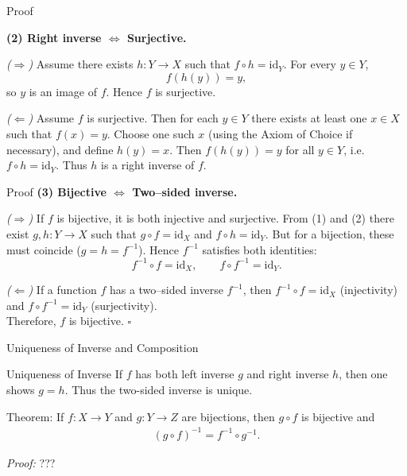 \begin{frame}{Proof }

\textbf{(2) Right inverse $\Leftrightarrow$ Surjective.}

\emph{($\Rightarrow$)}  
Assume there exists \(h:Y\to X\) such that \(f\circ h=\mathrm{id}_Y.\)  
For every \(y\in Y\),
\[
f(h(y)) = y,
\]
so \(y\) is an image of \(f\). Hence \(f\) is surjective.

\emph{($\Leftarrow$)}  
Assume \(f\) is surjective.  
Then for each \(y\in Y\) there exists at least one \(x\in X\) such that \(f(x)=y\).  
Choose one such \(x\) (using the Axiom of Choice if necessary), and define \(h(y)=x.\)  
Then \(f(h(y))=y\) for all \(y\in Y\), i.e. \(f\circ h=\mathrm{id}_Y.\)
Thus \(h\) is a right inverse of \(f.\)
\end{frame}

\begin{frame}{Proof }
\textbf{(3) Bijective $\Leftrightarrow$ Two–sided inverse.}

\emph{($\Rightarrow$)}  
If \(f\) is bijective, it is both injective and surjective.  
From (1) and (2) there exist \(g,h:Y\to X\) such that \(g\circ f=\mathrm{id}_X\) and \(f\circ h=\mathrm{id}_Y.\)  
But for a bijection, these must coincide (\(g=h=f^{-1}\)).  
Hence \(f^{-1}\) satisfies both identities:
\[
f^{-1}\circ f = \mathrm{id}_X,\qquad f\circ f^{-1} = \mathrm{id}_Y.
\]

\emph{($\Leftarrow$)}  
If a function \(f\) has a two–sided inverse \(f^{-1}\), then \(f^{-1}\circ f=\mathrm{id}_X\) (injectivity) and \(f\circ f^{-1}=\mathrm{id}_Y\) (surjectivity).\\ 

Therefore, \(f\) is bijective. \(\square\)
\end{frame}


\begin{frame}{Uniqueness of Inverse and Composition}
\begin{block}{Uniqueness of Inverse}
    If \(f\) has both left inverse \(g\) and right inverse \(h\), then one shows \(g = h\).  
Thus the two-sided inverse is unique.
\end{block}

\smallskip
\begin{block}{Theorem:} If \(f: X \to Y\) and \(g: Y \to Z\) are bijections, then \(g \circ f\) is bijective and
\begin{align*}
(g \circ f)^{-1} = f^{-1} \circ g^{-1}.
\end{align*}

\emph{Proof:} ??? 
    
\end{block}
\end{frame}

